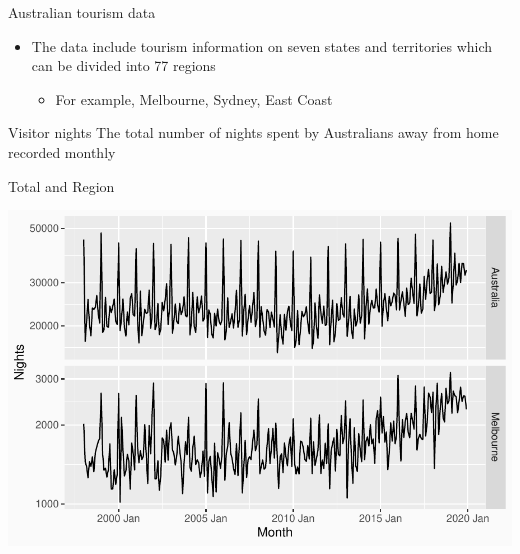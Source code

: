 \documentclass[14pt,ignorenonframetext,]{beamer}
\providecommand{\tightlist}{%
  \setlength{\itemsep}{0pt}\setlength{\parskip}{0pt}}
\begin{document}
\begin{frame}{Australian tourism data}
\protect\hypertarget{australian-tourism-data}{}
\begin{itemize}
\tightlist
\item
  The data include tourism information on seven states and territories
  which can be divided into 77 regions

  \begin{itemize}
  \tightlist
  \item
    For example, Melbourne, Sydney, East Coast
  \end{itemize}
\end{itemize}

\begin{block}{Visitor nights}
\protect\hypertarget{visitor-nights}{}
The total number of nights spent by Australians away from home recorded
monthly
\end{block}
\end{frame}

\begin{frame}{Total and Region}
\protect\hypertarget{total-and-region}{}
\begin{center}
\includegraphics[width=\linewidth]{plot/p_aus_mel}
\end{center}
\end{frame}
\end{document}
